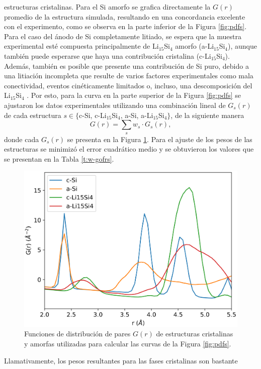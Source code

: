 estructuras cristalinas. Para el Si amorfo se grafica directamente la $G(r)$ 
promedio de la estructura simulada, resultando en una concordancia excelente con 
el experimento, como se observa en la parte inferior de la Figura \ref{fig:pdfs}.
Para el caso del ánodo de Si completamente litiado, se espera que la muestra 
experimental esté compuesta principalmente de Li$_{15}$Si$_4$ amorfo 
(a-Li$_{15}$Si$_4$), aunque también puede esperarse que haya una contribución 
cristalina (c-Li$_{15}$Si$_4$). Además, también es posible que presente una 
contribución de Si puro, debido a una litiación incompleta que resulte de varios 
factores experimentales como mala conectividad, eventos cinéticamente limitados 
o, incluso, una descomposición del Li$_{15}$Si$_4$ \cite{key2009, key2011}. Por 
esto, para la curva en la parte superior de la Figura \ref{fig:pdfs} se 
ajustaron los datos experimentales utilizando una combinación lineal de $G_s(r)$ 
de cada estructura $s \in \lbrace$c-Si, c-Li$_{15}$Si$_4$, a-Si,
a-Li$_{15}$Si$_4\rbrace$, de la siguiente manera 
\begin{equation}\label{eq:contributions}
    G(r) = \sum_s w_s \cdot G_s(r),
\end{equation}
donde cada $G_s(r)$ se presenta en la Figura \ref{fig:gofrs}. Para el 
ajuste de los pesos de las estructuras se minimizó el error cuadrático 
medio y se obtuvieron los valores que se presentan en la Tabla 
\ref{t:w-gofrs}.
\begin{figure}[h!]
    \centering
    \includegraphics[width=.7\textwidth]{Silicio/prediccion/resultados/xray/gofrs.png}
    \caption{Funciones de distribución de pares $G(r)$ de estructuras 
    cristalinas y amorfas utilizadas para calcular las curvas de la Figura 
    \ref{fig:pdfs}.}
    \label{fig:gofrs}
\end{figure}
Llamativamente, los pesos resultantes para las fases cristalinas son bastante 
